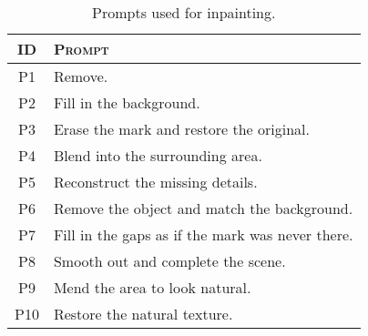 \begin{table}[h]
\caption{Prompts used for inpainting.}
\label{tab:prompts}
\vskip 0.15in
\begin{center}
\begin{small}
\begin{tabular}{c|l}
    \toprule
        \textsc{ID} & \textsc{ Prompt}  \\
        \midrule
        \textsc{P1} & Remove. \\
        \textsc{P2} & Fill in the background. \\
        \textsc{P3} & Erase the mark and restore the original. \\
        \textsc{P4} & Blend into the surrounding area. \\
        \textsc{P5} & Reconstruct the missing details. \\
        \textsc{P6} & Remove the object and match the background. \\
        \textsc{P7} & Fill in the gaps as if the mark was never there. \\
        \textsc{P8} & Smooth out and complete the scene. \\
        \textsc{P9} & Mend the area to look natural. \\
        \textsc{P10} &  Restore the natural texture. \\
    \bottomrule
\end{tabular}
\end{small}
\end{center}
\vskip -0.1in
\end{table} 